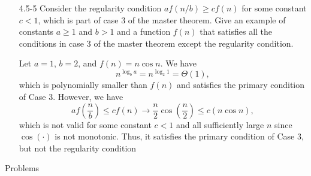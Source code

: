 \documentclass{report}
\makeatletter
\renewenvironment{framed}{%
 \def\FrameCommand##1{\hskip\@totalleftmargin
 \fboxsep=\FrameSep\fbox{##1}}%
 \MakeFramed {\advance\hsize-\width
   \@totalleftmargin\z@ \linewidth\hsize
   \@setminipage}}%
 {\par\unskip\endMakeFramed}
\makeatother
\begin{document}
\begin{enumerate}
\begin{framed}
\end{framed}

\item[4.5{-}5]{Consider the regularity condition $a f(n/b) \ge c f(n)$ for some
constant $c < 1$, which is part of case 3 of the master theorem. Give an example
of constants $a \ge 1$ and $b > 1$ and a function $f(n)$ that satisfies all
the conditions in case 3 of the master theorem except the regularity
condition.}

\begin{framed}
Let $a = 1$, $b = 2$, and $f(n) = n \cos n$. We have
\[
  n^{\log_b a} = n^{\log_2 1} = \Theta(1),
\]
which is polynomially smaller than $f(n)$ and satisfies the primary condition of
Case 3. However, we have
\[
  a f\left(\frac{n}{b}\right) \le c f(n) \rightarrow \frac{n}{2} \cos\left(\frac{n}{2}\right) \le c ( n \cos n ),
\]
which is not valid for some constant $c < 1$ and all sufficiently large $n$
since $\cos(\cdot)$ is not monotonic. Thus, it satisfies the primary condition
of Case 3, but not the regularity condition
\end{framed}

\end{enumerate}

\newpage

{\large Problems}
\end{document}
